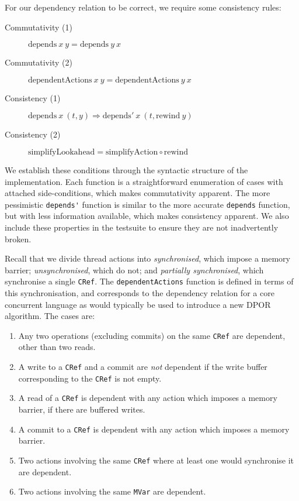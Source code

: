 For our dependency relation to be correct, we require some consistency
rules:

\begin{description}
\item[Commutativity (1)]
  $\mathrm{depends}~x~y = \mathrm{depends}~y~x$
\item[Commutativity (2)]
  $\mathrm{dependentActions}~x~y = \mathrm{dependentActions}~y~x$
\item[Consistency (1)]
  $\mathrm{depends}~x~(t,y) \Rightarrow \mathrm{depends'}~x~(t, \mathrm{rewind}~y)$
\item[Consistency (2)]
  $\mathrm{simplifyLookahead} = \mathrm{simplifyAction} \circ \mathrm{rewind}$
\end{description}

We establish these conditions through the syntactic structure of the
implementation.  Each function is a straightforward enumeration of
cases with attached side-conditions, which makes commutativity
apparent.  The more pessimistic \verb|depends'| function is similar to
the more accurate \verb|depends| function, but with less information
available, which makes consistency apparent.  We also include these
properties in the \dejafu{} testsuite to ensure they are not
inadvertently broken.

Recall that we divide thread actions into \emph{synchronised}, which
impose a memory barrier; \emph{unsynchronised}, which do not; and
\emph{partially synchronised}, which synchronise a single \verb|CRef|.
The \verb|dependentActions| function is defined in terms of this
synchronisation, and corresponds to the dependency relation for a core
concurrent language as would typically be used to introduce a new DPOR
algorithm.  The cases are:

\begin{enumerate}
\item Any two operations (excluding commits) on the same \verb|CRef|
  are dependent, other than two reads.
\item A write to a \verb|CRef| and a commit are \emph{not} dependent
  if the write buffer corresponding to the \verb|CRef| is not
  empty\cite{linden2013}.
\item A read of a \verb|CRef| is dependent with any action which
  imposes a memory barrier, if there are buffered writes.
\item A commit to a \verb|CRef| is dependent with any action which
  imposes a memory barrier.
\item Two actions involving the same \verb|CRef| where at least one
  would synchronise it are dependent.
\item Two actions involving the same \verb|MVar| are dependent.
\end{enumerate}

